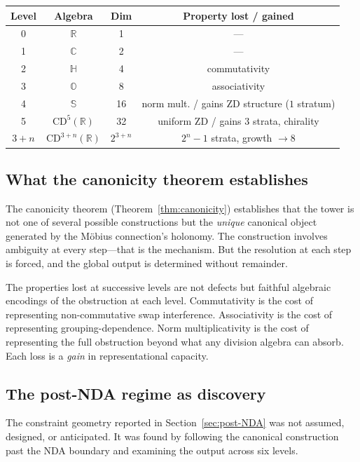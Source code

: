 \documentclass[12pt,a4paper]{article}
\theoremstyle{definition}
\theoremstyle{remark}
\newcommand{\R}{\mathbb{R}}
\newcommand{\C}{\mathbb{C}}
\newcommand{\HH}{\mathbb{H}}
\newcommand{\OO}{\mathbb{O}}
\newcommand{\Sed}{\mathbb{S}}
\newcommand{\CD}{\mathrm{CD}}
\begin{document}
\begin{center}
\begin{tabular}{c|c|c|c}
\textbf{Level} & \textbf{Algebra} & \textbf{Dim}
  & \textbf{Property lost / gained} \\
\hline
0 & $\R$ & 1 & --- \\
1 & $\C$ & 2 & --- \\
2 & $\HH$ & 4 & commutativity \\
3 & $\OO$ & 8 & associativity \\
4 & $\Sed$ & 16 & norm mult. / gains ZD structure ($1$ stratum) \\
5 & $\CD^5(\R)$ & 32 & uniform ZD / gains $3$ strata, chirality \\
$3{+}n$ & $\CD^{3+n}(\R)$ & $2^{3+n}$ &
  $2^n - 1$ strata, growth $\to 8$ \\
\end{tabular}
\end{center}

\subsection{What the canonicity theorem establishes}

The canonicity theorem
(Theorem~\ref{thm:canonicity}) establishes that the tower is not
one of several possible constructions but the \emph{unique}
canonical object generated by the M\"{o}bius connection's holonomy.
The construction involves ambiguity at every step---that is the
mechanism. But the resolution at each step is forced, and the
global output is determined without remainder.

The properties lost at successive levels are not defects but
faithful algebraic encodings of the obstruction at each level.
Commutativity is the cost of representing non-commutative swap
interference. Associativity is the cost of representing
grouping-dependence. Norm multiplicativity is the cost of
representing the full obstruction beyond what any division algebra
can absorb. Each loss is a \emph{gain} in representational
capacity.

\subsection{The post-NDA regime as discovery}

The constraint geometry reported in Section~\ref{sec:post-NDA}
was not assumed, designed, or anticipated. It was found by
following the canonical construction past the NDA boundary and
examining the output across six levels.
\end{document}
